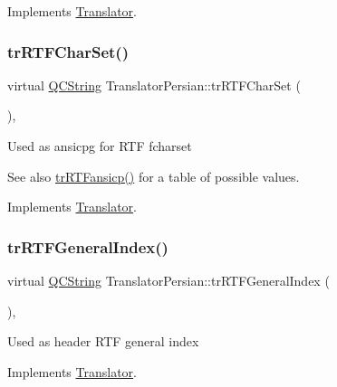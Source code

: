 Implements \mbox{\hyperlink{class_translator_a9953a4c0e6a4fc7d017abcd5c2939e0f}{Translator}}.

\mbox{\label{class_translator_persian_a25e7ec74ce148545edb8fc74c098c7b9}} 
\subsubsection{\texorpdfstring{trRTFCharSet()}{trRTFCharSet()}}
{\footnotesize\ttfamily virtual \mbox{\hyperlink{class_q_c_string}{Q\+C\+String}} Translator\+Persian\+::tr\+R\+T\+F\+Char\+Set (\begin{DoxyParamCaption}{ }\end{DoxyParamCaption})\hspace{0.3cm}{\ttfamily [inline]}, {\ttfamily [virtual]}}

Used as ansicpg for R\+TF fcharset \begin{DoxySeeAlso}{See also}
\mbox{\hyperlink{class_translator_persian_a726bd8cac1d4e5623e5538b522c1bf31}{tr\+R\+T\+Fansicp()}} for a table of possible values. 
\end{DoxySeeAlso}


Implements \mbox{\hyperlink{class_translator_afad391f3cbfb5ce6332b7239f8e2049a}{Translator}}.

\mbox{\label{class_translator_persian_a554a8ee5a92be3505a476b5288e89de5}} 
\subsubsection{\texorpdfstring{trRTFGeneralIndex()}{trRTFGeneralIndex()}}
{\footnotesize\ttfamily virtual \mbox{\hyperlink{class_q_c_string}{Q\+C\+String}} Translator\+Persian\+::tr\+R\+T\+F\+General\+Index (\begin{DoxyParamCaption}{ }\end{DoxyParamCaption})\hspace{0.3cm}{\ttfamily [inline]}, {\ttfamily [virtual]}}

Used as header R\+TF general index 

Implements \mbox{\hyperlink{class_translator}{Translator}}.


